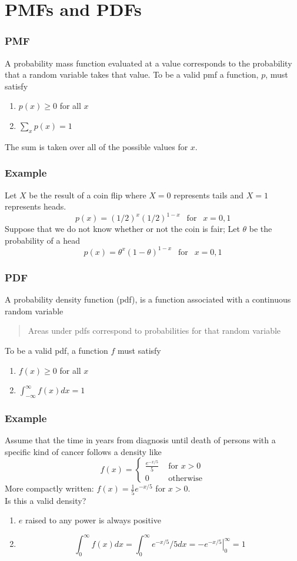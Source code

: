 \documentclass{beamer}
\begin{document}
\section{PMFs and PDFs}
\begin{frame}
\frametitle{PMF}
A probability mass function evaluated at a value corresponds to the
probability that a random variable takes that value. To be a valid
pmf a function, $p$, must satisfy
  \begin{enumerate}
  \item $p(x) \geq 0$ for all $x$
  \item $\sum_{x} p(x) = 1$
  \end{enumerate}
The sum is taken over all of the possible values for $x$.
\end{frame}


\begin{frame}
 \frametitle{Example}
Let $X$ be the result of a coin flip where $X=0$ represents
tails and $X = 1$ represents heads.
$$
p(x) = (1/2)^{x} (1/2)^{1-x} ~~\mbox{ for }~~x = 0,1
$$
Suppose that we do not know whether or not the coin is fair; Let
$\theta$ be the probability of a head
$$
p(x) = \theta^{x} (1 - \theta)^{1-x} ~~\mbox{ for }~~x = 0,1
$$
\end{frame}




\begin{frame}
\frametitle{PDF}
  A probability density function (pdf), is a function associated with
  a continuous random variable 
  \begin{quote}
    Areas under pdfs correspond to
probabilities for that random variable
  \end{quote}
 To be a valid pdf, a
 function $f$ must satisfy
\begin{enumerate}
\item $f(x) \geq 0$ for all $x$
\item $\int_{-\infty}^{\infty} f(x)dx = 1$
\end{enumerate}
\end{frame}

\begin{frame}
\frametitle{Example}
Assume that the time in years from diagnosis until death of persons
with a specific kind of cancer follows a density like
$$
f(x) = \left\{\begin{array}{ll}
    \frac{e^{-x/5}}{5} & \mbox{ for } x > 0 \\
    0                 & \mbox{ otherwise} 
\end{array} \right. 
$$
More compactly written: $f(x) = \frac{1}{5}e^{-x/5}$ for $x>0$. \\
Is this a valid density?\\
\begin{enumerate}
\item $e$ raised to any power is always positive
\item 
$$
\int_{0}^\infty f(x) dx = \int_{0}^\infty e^{-x/5} / 5 dx = \left. -e^{-x/5} \right|^{\infty}_0 = 1
$$
\end{enumerate}
\end{frame}
\end{document}
